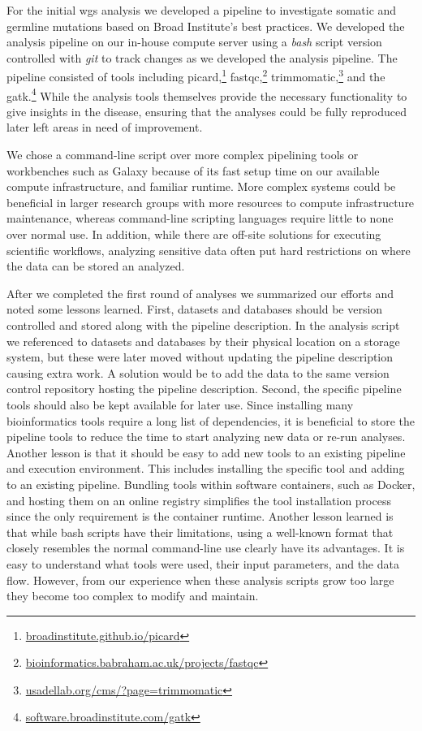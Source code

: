For the initial \gls{wgs} analysis we developed a pipeline to investigate
somatic and germline mutations based on Broad Institute's best practices. We
developed the analysis pipeline on our in-house compute server using a
\emph{bash} script version controlled with \emph{git} to track changes as we
developed the analysis pipeline. The pipeline consisted of tools including
picard,\footnote{\url{broadinstitute.github.io/picard}}
fastqc,\footnote{\url{bioinformatics.babraham.ac.uk/projects/fastqc}}
trimmomatic,\footnote{\url{usadellab.org/cms/?page=trimmomatic}} and the
\gls{gatk}.\footnote{\url{software.broadinstitute.com/gatk}} While the analysis
tools themselves provide the necessary functionality to give insights in
the disease, ensuring that the analyses could be fully reproduced later left
areas in need of improvement.

We chose a command-line script over more complex pipelining tools or workbenches
such as Galaxy\cite{galaxy} because of its fast setup time on our available
compute infrastructure, and familiar runtime. More complex systems could be
beneficial in larger research groups with more resources to compute
infrastructure maintenance, whereas command-line scripting languages require
little to none over normal use. In addition, while there are off-site solutions
for executing scientific workflows, analyzing sensitive data often put hard
restrictions on where the data can be stored an
analyzed.

After we completed the first round of analyses we summarized our efforts and
noted some lessons learned. 
First, datasets and databases should be version
controlled and stored along with the pipeline description. In the analysis
script we referenced to datasets and databases by their physical location on a
storage system, but these were later moved without updating the pipeline
description causing extra work. A solution would be to add the data to the same
version control repository hosting the pipeline description.
Second, the specific pipeline tools should also be kept available for later use.
Since installing many bioinformatics tools require a long list of dependencies,
it is beneficial to store the pipeline tools to reduce the time to start
analyzing new data or re-run analyses. 
Another lesson is that it should be easy to add new tools to an existing
pipeline and execution environment. This includes installing the specific tool
and adding to an existing pipeline.  Bundling tools within software containers,
such as Docker, and hosting them on an online registry simplifies the tool
installation process since the only requirement is the container runtime.
Another lesson learned is that while bash scripts have
their limitations, using a well-known format that closely resembles the normal
command-line use clearly have its advantages. It is easy to understand what
tools were used, their input parameters, and the data flow. However, from our
experience when these analysis scripts grow too large they become too complex to
modify and maintain. 

